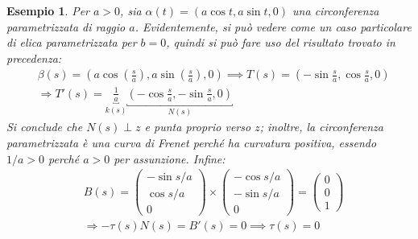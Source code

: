 \documentclass[12pt]{scrartcl}
\theoremstyle{style}
\newtheorem{esempio}{Esempio}[section]
\numberwithin{equation}{subsection}
\begin{document}
\begin{esempio}
Per $a>0$, sia $\alpha (t) = (a \cos t, a \sin t, 0)$ una circonferenza parametrizzata di raggio $a$.
Evidentemente, si pu\`o vedere come un caso particolare di elica parametrizzata per $b=0$, quindi si pu\`o fare uso del risultato trovato in precedenza:
\[
	\begin{split}
		&\beta (s) = \left(a \cos \left(\frac{s}{a}\right) , a\sin \left(\frac{s}{a}\right),0 \right)\implies T(s) = \left(- \sin \frac{s}{a}, \cos \frac{s}{a},0 \right) \\
		&\Rightarrow T'(s) = \underbracket{\frac{1}{a}}_{k(s)}  \underbracket{\left(-\cos \frac{s}{a},- \sin \frac{s}{a},0\right) }_{N(s)} 
	\end{split}
\] 
Si conclude che $N(s)\perp z$ e punta proprio verso $z$; inoltre, la circonferenza parametrizzata \`e una curva di Frenet perch\'e ha curvatura positiva, essendo $1 / a > 0 $ perch\'e $a > 0 $ per assunzione.
Infine:
\[
	\begin{split}
		&B(s) = \begin{pmatrix} -\sin s / a \\ \cos s / a \\ 0  \end{pmatrix} \times \begin{pmatrix} - \cos s / a\\ - \sin s / a \\ 0  \end{pmatrix} = \begin{pmatrix} 0 \\0 \\ 1 \end{pmatrix} \\
		&\Rightarrow -\tau (s) N(s) = B'(s) = 0 \implies \tau (s) = 0 
	\end{split}
\] 
\end{esempio}
\end{document}
